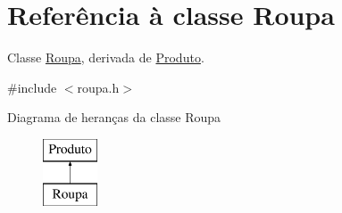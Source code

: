 \hypertarget{classRoupa}{\section{Referência à classe Roupa}
\label{classRoupa}
}


Classe \hyperlink{classRoupa}{Roupa}, derivada de \hyperlink{classProduto}{Produto}.  




{\ttfamily \#include $<$roupa.\-h$>$}

Diagrama de heranças da classe Roupa\begin{figure}[H]
\begin{center}
\leavevmode
\includegraphics[height=2.000000cm]{d9/d53/classRoupa}
\end{center}
\end{figure}
